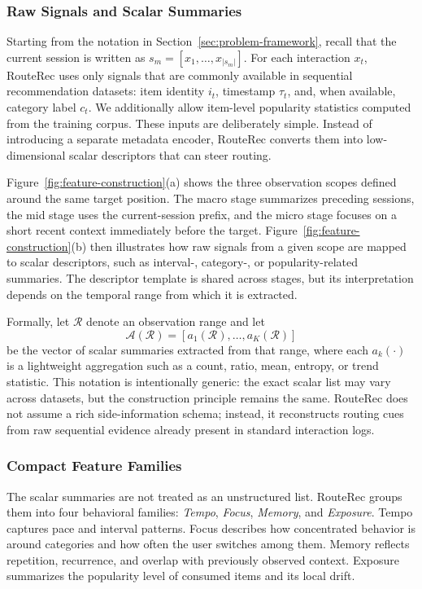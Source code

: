 \documentclass[sigconf,anonymous,review]{acmart}
\begin{document}
\subsubsection{Raw Signals and Scalar Summaries}

Starting from the notation in Section~\ref{sec:problem-framework}, recall that the current session is written as $s_m = [x_1, \dots, x_{|s_m|}]$. For each interaction $x_t$, RouteRec uses only signals that are commonly available in sequential recommendation datasets: item identity $i_t$, timestamp $\tau_t$, and, when available, category label $c_t$. We additionally allow item-level popularity statistics computed from the training corpus. These inputs are deliberately simple. Instead of introducing a separate metadata encoder, RouteRec converts them into low-dimensional scalar descriptors that can steer routing.

Figure~\ref{fig:feature-construction}(a) shows the three observation scopes defined around the same target position. The macro stage summarizes preceding sessions, the mid stage uses the current-session prefix, and the micro stage focuses on a short recent context immediately before the target. Figure~\ref{fig:feature-construction}(b) then illustrates how raw signals from a given scope are mapped to scalar descriptors, such as interval-, category-, or popularity-related summaries. The descriptor template is shared across stages, but its interpretation depends on the temporal range from which it is extracted.

Formally, let $\mathcal{R}$ denote an observation range and let
\[
\mathcal{A}(\mathcal{R}) = [a_1(\mathcal{R}), \dots, a_K(\mathcal{R})]
\]
be the vector of scalar summaries extracted from that range, where each $a_k(\cdot)$ is a lightweight aggregation such as a count, ratio, mean, entropy, or trend statistic. This notation is intentionally generic: the exact scalar list may vary across datasets, but the construction principle remains the same. RouteRec does not assume a rich side-information schema; instead, it reconstructs routing cues from raw sequential evidence already present in standard interaction logs.

\subsubsection{Compact Feature Families}

The scalar summaries are not treated as an unstructured list. RouteRec groups them into four behavioral families: \textit{Tempo}, \textit{Focus}, \textit{Memory}, and \textit{Exposure}. Tempo captures pace and interval patterns. Focus describes how concentrated behavior is around categories and how often the user switches among them. Memory reflects repetition, recurrence, and overlap with previously observed context. Exposure summarizes the popularity level of consumed items and its local drift.
\end{document}
